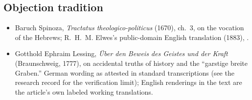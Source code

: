 \subsection*{Objection tradition}

{\fontsize{8.6}{9.6}\selectfont
\begin{itemize}[itemsep=0pt,parsep=0pt,topsep=0.05em]
\item Baruch Spinoza, \emph{Tractatus theologico-politicus} (1670), ch.~3, on the vocation of the Hebrews; R.~H.~M. Elwes's public-domain English translation (1883), .
\item Gotthold Ephraim Lessing, \emph{\"Uber den Beweis des Geistes und der Kraft} (Braunschweig, 1777), on accidental truths of history and the ``garstige breite Graben.'' German wording as attested in standard transcriptions (see the research record for the verification limit); English renderings in the text are the article's own labeled working translations.
\end{itemize}}

\endgroup
